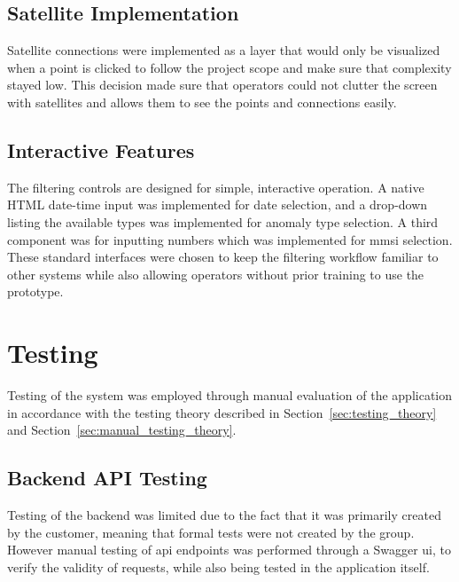 \subsection{Satellite Implementation}

Satellite connections were implemented as a layer that would only be visualized when a point is clicked to follow the project scope and make sure that complexity stayed low. This decision made sure that operators could not clutter the screen with satellites and allows them to see the points and connections easily.

\subsection{Interactive Features}

The filtering controls are designed for simple, interactive operation. A native HTML date-time input was implemented for date selection, and a drop-down listing the available types was implemented for anomaly type selection. A third component was for inputting numbers which was implemented for \acrshort{mmsi} selection. These standard interfaces were chosen to keep the filtering workflow familiar to other systems while also allowing operators without prior training to use the prototype.


\section{Testing}
\label{sec:testing_method}
Testing of the system was employed through manual evaluation of the application in accordance with the testing theory described in Section~\ref{sec:testing_theory} and Section~\ref{sec:manual_testing_theory}.


\subsection{Backend API Testing}


Testing of the backend was limited due to the fact that it was primarily created by the customer, meaning that formal tests were not created by the group. However manual testing of \acrshort{api} endpoints was performed through a Swagger \acrshort{ui}, to verify the validity of requests, while also being tested in the application itself.

